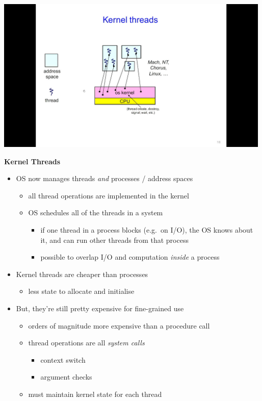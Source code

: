 \documentclass[11pt,a4paper]{article}
\begin{document}
\includegraphics[height=280]{kernel-threads.jpg}

\textbf{Kernel Threads}
\begin{itemize}
    \item OS now manages threads \emph{and} processes / address spaces
        \begin{itemize}
            \item all thread operations are implemented in the kernel
            \item OS schedules all of the threads in a system
                \begin{itemize}
                    \item if one thread in a process blocks (e.g.\ on I/O),
                        the OS knows about it, and can run other threads from that process
                    \item possible to overlap I/O and computation \emph{inside} a process
                \end{itemize}
        \end{itemize}
    \item Kernel threads are cheaper than processes
        \begin{itemize}
            \item less state to allocate and initialise
        \end{itemize}
    \item But, they're still pretty expensive for fine-grained use
        \begin{itemize}
            \item orders of magnitude more expensive than a procedure call
            \item thread operations are all \emph{system calls}
                \begin{itemize}
                    \item context switch
                    \item argument checks
                \end{itemize}
            \item must maintain kernel state for each thread
        \end{itemize}
\end{itemize}
\end{document}
